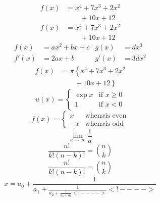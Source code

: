 \begin{align*}
  f(x) &= x^4 + 7x^3 + 2x^2 \\
  &\qquad {} + 10x + 12
\end{align*}  
\begin{align}
  f(x) &= x^4 + 7x^3 + 2x^2 \nonumber \\
  &\qquad {} + 10x + 12
\end{align}
\begin{align*}
 f(x)  &= ax^2 + bx + c    &  g(x) &= dx^3 \\
 f'(x) &= 2ax + b          &  g'(x) &= 3dx^2  
\end{align*}
\begin{align}
 f(x) &= \pi \left\{x^4 + 7x^3 + 2x^2 \right.\nonumber \\
 &\qquad \left. {} + 10x + 12 \right\}
\end{align}
\[
u(x) =
\begin{cases}
\exp{x} & \text{if } x \geq 0 \\
1 & \text{if } x < 0
\end{cases}
\]
\[
f(x) =
\begin{cases}
x & \text{when} x \text{is even} \\
-x & \text{when} x \text{is odd}
\end{cases}
\]
\begin{equation}
\lim_{a\to \infty} \frac{1}{a}
\end{equation}
\begin{equation}
\frac{n!}{k!(n-k)!} = {n \choose k}
\end{equation}
\begin{equation}
\frac{n!}{k!(n-k)!} = \binom{n}{k}
\end{equation}
\begin{equation}
x = a_0 + \frac{1}{\displaystyle a_1
+ \frac{1}{\displaystyle a_2
+ \frac{1}{\displaystyle a_3 + a_4}<!-- -->}<!-- -->}
\end{equation}

